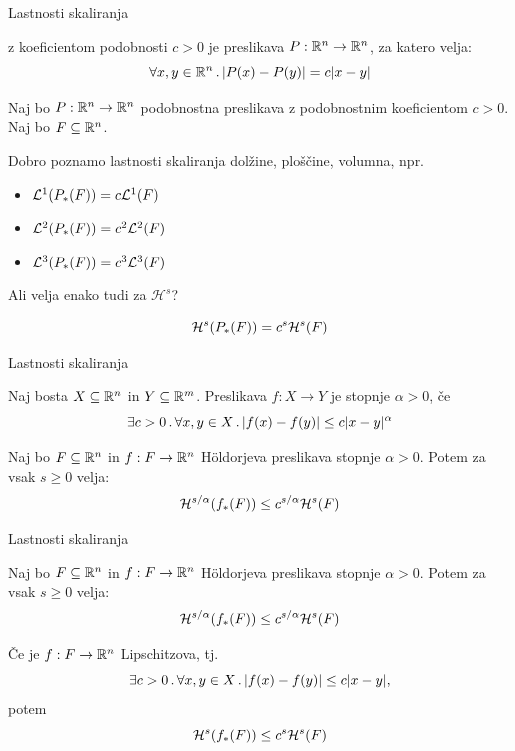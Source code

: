 \documentclass[10pt]{beamer}
\begin{document}
\begin{frame}[t]{Lastnosti skaliranja}
     {
        \begin{definicija}
             z koeficientom podobnosti \(c > 0\) je preslikava \(P: \mathbb{R}^n \to \mathbb{R}^n\), za katero velja:
            \[\forall x, y \in \mathbb{R}^n \,.\, |P(x) - P(y)| = c|x-y|\]
        \end{definicija}
    }
    \pause
    Naj bo \(P: \mathbb{R}^n \to \mathbb{R}^n\) podobnostna preslikava z podobnostnim koeficientom \(c > 0\). Naj bo \(F \subseteq \mathbb{R}^n\).
    
     {
        Dobro poznamo lastnosti skaliranja dolžine, ploščine, volumna, npr.
        \begin{itemize}
            \item \(\mathcal{L}^1(P_{*}(F)) = c \mathcal{L}^1(F)\)
            \item \(\mathcal{L}^2(P_{*}(F)) = c^2 \mathcal{L}^2(F)\)
            \item \(\mathcal{L}^3(P_{*}(F)) = c^3 \mathcal{L}^3(F)\)
        \end{itemize}
        Ali velja enako tudi za \(\mathcal{H}^s\)?
    }
    \pause
    \begin{trditev}
        \[\mathcal{H}^s(P_{*}(F)) = c^s \mathcal{H}^s(F)\]
    \end{trditev}   
\end{frame}

\begin{frame}[t]{Lastnosti skaliranja}
    \begin{definicija} Naj bosta \(X \subseteq \mathbb{R}^n\) in \(Y \subseteq \mathbb{R}^m\).
        Preslikava \(f: X \to Y\) je  stopnje \(\alpha > 0\), če
        \[\exists c > 0 \,.\, \forall x, y \in X \,.\, |f(x) -f(y)| \leq c|x-y|^\alpha\]             
    \end{definicija}  
    \pause
    \begin{trditev}
        Naj bo \(F \subseteq \mathbb{R}^n\) in \(f: F \to \mathbb{R}^n\) Höldorjeva preslikava stopnje \(\alpha > 0\). Potem za vsak \(s \geq 0\) velja:
        \[\mathcal{H}^{s/\alpha}(f_{*}(F)) \leq c^{s/\alpha} \mathcal{H}^s(F)\]
    \end{trditev}
\end{frame}

\begin{frame}[t]{Lastnosti skaliranja}
    \begin{trditev}
        Naj bo \(F \subseteq \mathbb{R}^n\) in \(f: F \to \mathbb{R}^n\) Höldorjeva preslikava stopnje \(\alpha > 0\). Potem za vsak \(s \geq 0\) velja:
        \[\mathcal{H}^{s/\alpha}(f_{*}(F)) \leq c^{s/\alpha} \mathcal{H}^s(F)\]
    \end{trditev}

    \begin{posledica}
        Če je \(f: F \to \mathbb{R}^n\) Lipschitzova, tj.
        \[\exists c > 0 \,.\, \forall x, y \in X \,.\, |f(x) -f(y)| \leq c|x-y|,\]
        potem
        \[\mathcal{H}^{s}(f_{*}(F)) \leq c^{s} \mathcal{H}^s(F)\]
    \end{posledica}
\end{frame}
\end{document}
